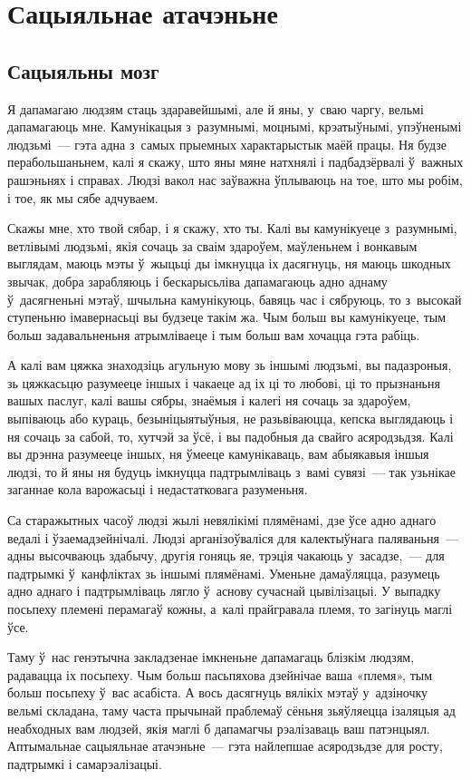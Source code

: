 \chapter{Сацыяльнае атачэньне}

\section{Сацыяльны мозг}

Я дапамагаю людзям стаць здаравейшымі, але й яны, у~сваю чаргу, вельмі дапамагаюць мне. Камунікацыя з~разумнымі, моцнымі, крэатыўнымі, упэўненымі людзьмі~--- гэта адна з~самых прыемных характарыстык маёй працы. Ня будзе перабольшаньнем, калі я скажу, што яны мяне натхнялі і падбадзёрвалі ў~важных рашэньнях і справах. Людзі вакол нас заўважна ўплываюць на тое, што мы робім, і тое, як мы сябе адчуваем.

Скажы мне, хто твой сябар, і я скажу, хто ты. Калі вы камунікуеце з~разумнымі, ветлівымі людзьмі, якія сочаць за сваім здароўем, маўленьнем і вонкавым выглядам, маюць мэты ў~жыцьці ды імкнуцца іх дасягнуць, ня маюць шкодных звычак, добра зарабляюць і бескарысьліва дапамагаюць адно аднаму ў~дасягненьні мэтаў, шчыльна камунікуюць, бавяць час і сябруюць, то з~высокай ступеньню імавернасьці вы будзеце такім жа. Чым больш вы камунікуеце, тым больш задавальненьня атрымліваеце і тым больш вам хочацца гэта рабіць.

А калі вам цяжка знаходзіць агульную мову зь іншымі людзьмі, вы падазроныя, зь цяжкасьцю разумееце іншых і чакаеце ад іх ці то любові, ці то прызнаньня вашых паслуг, калі вашы сябры, знаёмыя і калегі ня сочаць за здароўем, выпіваюць або кураць, безыніцыятыўныя, не разьвіваюцца, кепска выглядаюць і ня сочаць за сабой, то, хутчэй за ўсё, і вы падобныя да свайго асяродзьдзя. Калі вы дрэнна разумееце іншых, ня ўмееце камунікаваць, вам абыякавыя іншыя людзі, то й яны ня будуць імкнуцца падтрымліваць з~вамі сувязі~--- так узьнікае заганнае кола варожасьці і недастатковага разуменьня.

Са старажытных часоў людзі жылі невялікімі плямёнамі, дзе ўсе адно аднаго ведалі і ўзаемадзейнічалі. Людзі арганізоўваліся для калектыўнага паляваньня~--- адны высочваюць здабычу, другія гоняць яе, трэція чакаюць у~засадзе,~--- для падтрымкі ў~канфліктах зь іншымі плямёнамі. Уменьне дамаўляцца, разумець адно аднаго і падтрымліваць лягло ў~аснову сучаснай цывілізацыі. У выпадку посьпеху племені перамагаў кожны, а~калі прайгравала племя, то загінуць маглі ўсе.

Таму ў~нас генэтычна закладзенае імкненьне дапамагаць блізкім людзям, радавацца іх посьпеху. Чым больш пасьпяхова дзейнічае ваша «племя», тым больш посьпеху ў~вас асабіста. А вось дасягнуць вялікіх мэтаў у~адзіночку вельмі складана, таму часта прычынай праблемаў сёньня зьяўляецца ізаляцыя ад неабходных вам людзей, якія маглі б дапамагчы рэалізаваць ваш патэнцыял. Аптымальнае сацыяльнае атачэньне~--- гэта найлепшае асяродзьдзе для росту, падтрымкі і самарэалізацыі.

